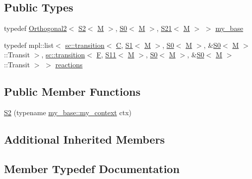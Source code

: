 \subsection*{Public Types}
\begin{DoxyCompactItemize}
\item 
typedef \mbox{\hyperlink{struct_orthogonal2}{Orthogonal2}}$<$ \mbox{\hyperlink{struct_s2}{S2}}$<$ \mbox{\hyperlink{struct_m}{M}} $>$, \mbox{\hyperlink{struct_s0}{S0}}$<$ \mbox{\hyperlink{struct_m}{M}} $>$, \mbox{\hyperlink{struct_s21}{S21}}$<$ \mbox{\hyperlink{struct_m}{M}} $>$ $>$ \mbox{\hyperlink{struct_s2_a37188d65c88846ab9ffe243fda7ddc5b}{my\+\_\+base}}
\item 
typedef mpl\+::list$<$ \mbox{\hyperlink{classboost_1_1statechart_1_1transition}{sc\+::transition}}$<$ \mbox{\hyperlink{struct_c}{C}}, \mbox{\hyperlink{struct_s1}{S1}}$<$ \mbox{\hyperlink{struct_m}{M}} $>$, \mbox{\hyperlink{struct_s0}{S0}}$<$ \mbox{\hyperlink{struct_m}{M}} $>$, \&\mbox{\hyperlink{struct_s0}{S0}}$<$ \mbox{\hyperlink{struct_m}{M}} $>$\+::Transit $>$, \mbox{\hyperlink{classboost_1_1statechart_1_1transition}{sc\+::transition}}$<$ \mbox{\hyperlink{struct_f}{F}}, \mbox{\hyperlink{struct_s11}{S11}}$<$ \mbox{\hyperlink{struct_m}{M}} $>$, \mbox{\hyperlink{struct_s0}{S0}}$<$ \mbox{\hyperlink{struct_m}{M}} $>$, \&\mbox{\hyperlink{struct_s0}{S0}}$<$ \mbox{\hyperlink{struct_m}{M}} $>$\+::Transit $>$ $>$ \mbox{\hyperlink{struct_s2_af56cfc6a349522edebd2e00aa3790d03}{reactions}}
\end{DoxyCompactItemize}
\subsection*{Public Member Functions}
\begin{DoxyCompactItemize}
\item 
\mbox{\hyperlink{struct_s2_a086237c4e2491ccf22ebc9120c50df53}{S2}} (typename \mbox{\hyperlink{struct_orthogonal2_a7ba3bc806df60eb29290185043ac202e}{my\+\_\+base\+::my\+\_\+context}} ctx)
\end{DoxyCompactItemize}
\subsection*{Additional Inherited Members}


\subsection{Member Typedef Documentation}
\mbox{\label{struct_s2_a37188d65c88846ab9ffe243fda7ddc5b}} 
